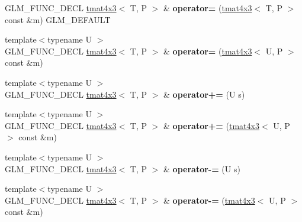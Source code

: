 \begin{DoxyCompactItemize}
\item 
\hypertarget{structglm_1_1tmat4x3_aec1ec9625bd7a013f5349c873a5040a9}{G\-L\-M\-\_\-\-F\-U\-N\-C\-\_\-\-D\-E\-C\-L \hyperlink{structglm_1_1tmat4x3}{tmat4x3}$<$ T, P $>$ \& {\bfseries operator=} (\hyperlink{structglm_1_1tmat4x3}{tmat4x3}$<$ T, P $>$ const \&m) G\-L\-M\-\_\-\-D\-E\-F\-A\-U\-L\-T}\label{structglm_1_1tmat4x3_aec1ec9625bd7a013f5349c873a5040a9}

\item 
\hypertarget{structglm_1_1tmat4x3_a1a8400e31fd17c23aff288242b7a78ca}{{\footnotesize template$<$typename U $>$ }\\G\-L\-M\-\_\-\-F\-U\-N\-C\-\_\-\-D\-E\-C\-L \hyperlink{structglm_1_1tmat4x3}{tmat4x3}$<$ T, P $>$ \& {\bfseries operator=} (\hyperlink{structglm_1_1tmat4x3}{tmat4x3}$<$ U, P $>$ const \&m)}\label{structglm_1_1tmat4x3_a1a8400e31fd17c23aff288242b7a78ca}

\item 
\hypertarget{structglm_1_1tmat4x3_a24679f2dacf9cc1f8f708f40bb1f3aab}{{\footnotesize template$<$typename U $>$ }\\G\-L\-M\-\_\-\-F\-U\-N\-C\-\_\-\-D\-E\-C\-L \hyperlink{structglm_1_1tmat4x3}{tmat4x3}$<$ T, P $>$ \& {\bfseries operator+=} (U s)}\label{structglm_1_1tmat4x3_a24679f2dacf9cc1f8f708f40bb1f3aab}

\item 
\hypertarget{structglm_1_1tmat4x3_a74f871665b46c2f00ef0bd0267816e4b}{{\footnotesize template$<$typename U $>$ }\\G\-L\-M\-\_\-\-F\-U\-N\-C\-\_\-\-D\-E\-C\-L \hyperlink{structglm_1_1tmat4x3}{tmat4x3}$<$ T, P $>$ \& {\bfseries operator+=} (\hyperlink{structglm_1_1tmat4x3}{tmat4x3}$<$ U, P $>$ const \&m)}\label{structglm_1_1tmat4x3_a74f871665b46c2f00ef0bd0267816e4b}

\item 
\hypertarget{structglm_1_1tmat4x3_a124dd7f16916a27ab14d698c0760f6f2}{{\footnotesize template$<$typename U $>$ }\\G\-L\-M\-\_\-\-F\-U\-N\-C\-\_\-\-D\-E\-C\-L \hyperlink{structglm_1_1tmat4x3}{tmat4x3}$<$ T, P $>$ \& {\bfseries operator-\/=} (U s)}\label{structglm_1_1tmat4x3_a124dd7f16916a27ab14d698c0760f6f2}

\item 
\hypertarget{structglm_1_1tmat4x3_a7c8ddab1781bfac021f6ccb388f4320c}{{\footnotesize template$<$typename U $>$ }\\G\-L\-M\-\_\-\-F\-U\-N\-C\-\_\-\-D\-E\-C\-L \hyperlink{structglm_1_1tmat4x3}{tmat4x3}$<$ T, P $>$ \& {\bfseries operator-\/=} (\hyperlink{structglm_1_1tmat4x3}{tmat4x3}$<$ U, P $>$ const \&m)}\label{structglm_1_1tmat4x3_a7c8ddab1781bfac021f6ccb388f4320c}


\end{DoxyCompactItemize}

